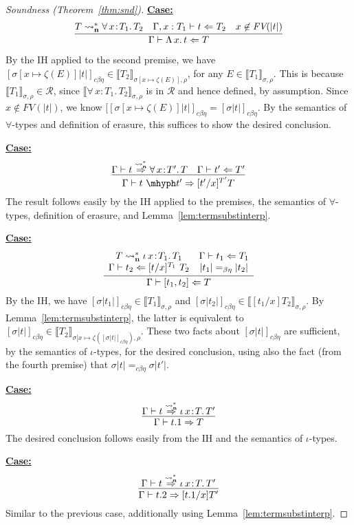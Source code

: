 \documentclass{article}
\newcommand{\choice}[0]{\zeta}
\newcommand{\abs}[4]{{#1}\, #2\! : \! #3.\, #4}
\newcommand{\absu}[3]{{#1}\, #2.\, #3}
\newcommand{\interp}[1]{\llbracket #1 \rrbracket}
\newcommand{\leadstocs}[0]{\ensuremath{\leadsto_{\mathbf{n}}^*}}
\newcommand{\tpcheck}[0]{\Leftarrow}
\newcommand{\tpsynth}[0]{\Rightarrow}
\newcommand{\tpsynthleads}[0]{\ensuremath{\overset{\leadstocs}{\Rightarrow}}}
\newcommand{\cbe}[0]{c\beta\eta}
\newcommand{\startcase}[1]{\vspace{#1} \noindent\textbf{\underline{Case:}}}
\begin{document}
\begin{proof}[Soundness (Theorem~\ref{thm:snd})]
\startcase{.2cm}
\[
  \infer{\Gamma\vdash \absu{\Lambda}{x}{t} \tpcheck T}
  {T \leadstocs \abs{\forall}{x}{T_1}{T_2} & \Gamma,x:T_1\vdash t \tpcheck T_2 & x\not\in\textit{FV}(|t|)}
\]

By the IH applied to the second premise, we have
$[\sigma[x\mapsto\choice(E)]
|t|]_{\cbe}\in\interp{T_2}_{\sigma[x\mapsto\choice(E)],\rho}$, for any
$E\in\interp{T_1}_{\sigma,\rho}$.
This is because $\interp{T_1}_{\sigma,\rho}\in\mathcal{R}$, since
$\interp{\abs{\forall}{x}{T_1}{T_2}}_{\sigma,\rho}$ is in $\mathcal{R}$ and 
hence defined, by assumption.
Since $x\not\in\textit{FV}(|t|)$, we know
$[[\sigma[x\mapsto\choice(E)]|t|]_{\cbe} = [\sigma |t|]_{\cbe}$.
By the semantics of $\forall$-types and definition of erasure, this suffices to
show the desired conclusion.

\startcase{.2cm}
\[
  \infer{\Gamma\vdash t\ \mhyph t' \tpsynth [t'/x]^{T'}T}{\Gamma\vdash t \tpsynthleads \abs{\forall}{x}{T'}{T} & \Gamma\vdash t' \tpcheck T'} \\ \\
\]
The result follows easily by the IH applied to the premises, the
semantics of $\forall$-types, definition of erasure, and Lemma~\ref{lem:termsubstinterp}.


\startcase{.2cm}
\[
  \infer{\Gamma\vdash [ t_1 , t_2 ] \tpcheck T}
  {
    \begin{array}{cc}
      T \leadstocs \abs{\iota}{x}{T_1}{T_1}
      & \Gamma \vdash t_1 \tpcheck T_1
      \\ \Gamma \vdash t_2 \tpcheck [t/x]^{T_1}\ T_2
      & |t_1| =_{\beta\eta} |t_2|
    \end{array}
  }
\]
By the IH, we have $[\sigma |t_1|]_{\cbe}\in\interp{T_1}_{\sigma,\rho}$ and
$[\sigma |t_2|]_{\cbe}\in\interp{[t_1/x]T_2}_{\sigma,\rho}$.
By Lemma~\ref{lem:termsubstinterp}, the latter is equivalent to
$[\sigma |t|]_{\cbe}\in\interp{T_2}_{\sigma[x\mapsto\choice([\sigma
  |t|]_{\cbe}),\rho}$.
These two facts about $[\sigma |t|]_{\cbe}$ are
sufficient, by the semantics of $\iota$-types, for the desired
conclusion, using also the fact (from the fourth premise) that $\sigma|t| =_{\cbe} \sigma|t'|$.

\startcase{.2cm}
\[
  \infer{\Gamma\vdash t.1 \tpsynth T}{\Gamma\vdash t \tpsynthleads \abs{\iota}{x}{T}{T'}}
\]
The desired conclusion follows easily from the IH and the semantics of $\iota$-types.

\startcase{.2cm}
\[
  \infer{\Gamma\vdash t.2 \tpsynth [t.1/x] T'}{\Gamma\vdash t \tpsynthleads \abs{\iota}{x}{T}{T'}}
\]
Similar to the previous case, additionally using Lemma~\ref{lem:termsubstinterp}.


\end{proof}
\end{document}
